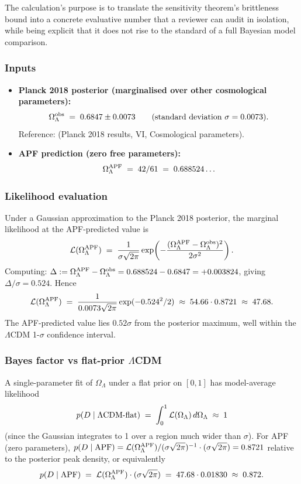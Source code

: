 \documentclass[11pt]{article}
\theoremstyle{plain}
\theoremstyle{definition}
\theoremstyle{remark}
\begin{document}
\noindent The calculation's purpose is to translate the sensitivity theorem's brittleness bound into a concrete evaluative number that a reviewer can audit in isolation, while being explicit that it does not rise to the standard of a full Bayesian model comparison.

\subsubsection*{Inputs}

\begin{itemize}[leftmargin=2em,itemsep=3pt]
  \item \textbf{Planck 2018 posterior (marginalised over other cosmological parameters):}
  \[
    \Omega_\Lambda^{\rm obs} \;=\; 0.6847 \pm 0.0073
    \qquad (\text{standard deviation } \sigma = 0.0073).
  \]
  Reference: \cite{Planck2018} (Planck 2018 results, VI, Cosmological parameters).
  \item \textbf{APF prediction (zero free parameters):}
  \[
    \Omega_\Lambda^{\rm APF} \;=\; 42/61 \;=\; 0.688524\ldots
  \]
\end{itemize}

\subsubsection*{Likelihood evaluation}

Under a Gaussian approximation to the Planck 2018 posterior, the marginal likelihood at the APF-predicted value is
\[
  \mathcal{L}(\Omega_\Lambda^{\rm APF}) \;=\; \frac{1}{\sigma\sqrt{2\pi}} \exp\!\left( -\frac{(\Omega_\Lambda^{\rm APF} - \Omega_\Lambda^{\rm obs})^2}{2\sigma^2} \right).
\]
Computing: $\Delta := \Omega_\Lambda^{\rm APF} - \Omega_\Lambda^{\rm obs} = 0.688524 - 0.6847 = +0.003824$, giving $\Delta/\sigma = 0.524$.  Hence
\[
  \mathcal{L}(\Omega_\Lambda^{\rm APF}) \;=\; \frac{1}{0.0073\sqrt{2\pi}} \exp(-0.524^2/2)
  \;\approx\; 54.66 \cdot 0.8721
  \;\approx\; 47.68.
\]
The APF-predicted value lies $0.52\sigma$ from the posterior maximum, well within the $\Lambda$CDM 1-$\sigma$ confidence interval.

\subsubsection*{Bayes factor vs flat-prior $\Lambda$CDM}

A single-parameter fit of $\Omega_\Lambda$ under a flat prior on $[0, 1]$ has model-average likelihood
\[
  p(D \mid \Lambda{\rm CDM\text{-}flat}) \;=\; \int_0^1 \mathcal{L}(\Omega_\Lambda) \,d\Omega_\Lambda
  \;\approx\; 1
\]
(since the Gaussian integrates to 1 over a region much wider than $\sigma$).  For APF (zero parameters), $p(D \mid {\rm APF}) = \mathcal{L}(\Omega_\Lambda^{\rm APF}) / (\sigma\sqrt{2\pi})^{-1} \cdot (\sigma\sqrt{2\pi}) = 0.8721$ relative to the posterior peak density, or equivalently
\[
  p(D \mid {\rm APF}) \;=\; \mathcal{L}(\Omega_\Lambda^{\rm APF}) \cdot (\sigma\sqrt{2\pi}) \;=\; 47.68 \cdot 0.01830 \;\approx\; 0.872.
\]
\end{document}
